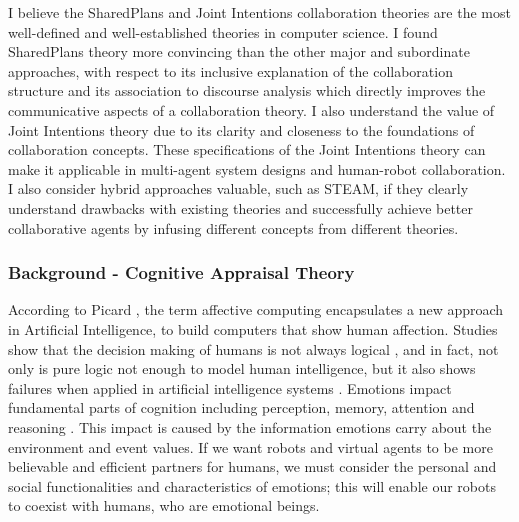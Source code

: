 \documentclass[a4paper, 10pt]{article}
\begin{document}
\begin{small}

I believe the SharedPlans and Joint Intentions collaboration theories are the
most well-defined and well-established theories in computer science. I found
SharedPlans theory more convincing than the other major and subordinate
approaches, with respect to its inclusive explanation of the collaboration
structure and its association to discourse analysis which directly improves the
communicative aspects of a collaboration theory. I also understand the value of
Joint Intentions theory due to its clarity and closeness to the foundations of
collaboration concepts. These specifications of the Joint Intentions theory can
make it applicable in multi-agent system designs and human-robot collaboration.
I also consider hybrid approaches valuable, such as STEAM, if they clearly
understand drawbacks with existing theories and successfully achieve better
collaborative agents by infusing different concepts from different theories.

\subsubsection*{Background - Cognitive Appraisal Theory}

According to Picard \cite{picard:affective-computing}, the term affective
computing encapsulates a new approach in Artificial Intelligence, to build
computers that show human affection. Studies show that the decision making of
humans is not always logical \cite{GrossbergGutowski:affect-cognition}, and in
fact, not only is pure logic not enough to model human intelligence, but it also
shows failures when applied in artificial intelligence systems
\cite{dreyfus:artificial-critique}. Emotions impact fundamental parts of
cognition including perception, memory, attention and reasoning
\cite{clore:judgement-regulation}. This impact is caused by the information
emotions carry about the environment and event values. If we want robots and
virtual agents to be more believable and efficient partners for humans, we must
consider the personal and social functionalities and characteristics of
emotions; this will enable our robots to coexist with humans, who are emotional
beings.


\end{small}
\end{document}
